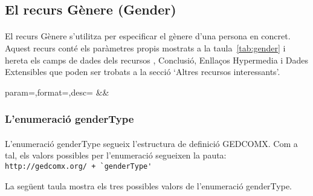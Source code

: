 \subsection{El recurs Gènere (Gender)}

    \paragraph{}
    El recurs Gènere s'utilitza per especificar el gènere d'una persona en concret. Aquest recurs conté els paràmetres propis mostrats a la taula~\ref{tab:gender} i hereta els camps de dades dels recursos , Conclusió, Enllaços Hypermedia i Dades Extensibles que poden ser trobats a la secció `Altres recursos interessants'.

    \begin{center}
             {param=\param,format=\format,desc=\desc}
             {\param&\format&\desc}
     \end{center}


     \subsubsection{L'enumeració genderType}

     \paragraph{}
     L'enumeració genderType segueix l'estructura de definició GEDCOMX. Com a tal, els valors possibles per l'enumeració segueixen la pauta:\\\verb|http://gedcomx.org/ + `genderType'|

     La següent taula mostra els tres possibles valors de l'enumeració genderType.

